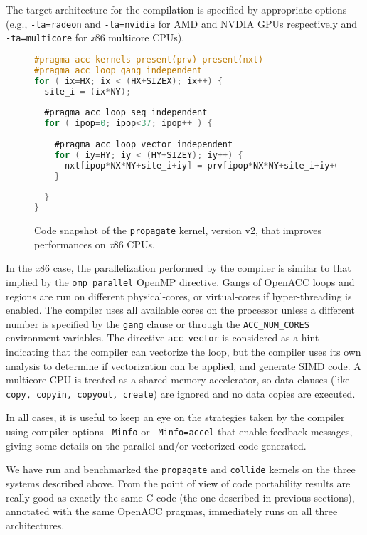 \documentclass[times]{cpeauth}
\begin{document}
The target architecture for the compilation is specified by appropriate
options  (e.g., {\tt -ta=radeon} and {\tt -ta=nvidia} for AMD and NVDIA
GPUs respectively and {\tt -ta=multicore}  for {\em x}86 multicore CPUs).

%
\begin{figure}
\centering
\begin{lstlisting}[language=C,basicstyle=\footnotesize]
#pragma acc kernels present(prv) present(nxt)
#pragma acc loop gang independent
for ( ix=HX; ix < (HX+SIZEX); ix++) {
  site_i = (ix*NY);
  
  #pragma acc loop seq independent
  for ( ipop=0; ipop<37; ipop++ ) {
  
    #pragma acc loop vector independent
    for ( iy=HY; iy < (HY+SIZEY); iy++) {
      nxt[ipop*NX*NY+site_i+iy] = prv[ipop*NX*NY+site_i+iy+OFFSET[ipop]];
    }
     
  }
}
\end{lstlisting}
\caption{\label{fig:propagate2} Code snapshot of the {\tt propagate} kernel, 
version v2, that improves performances on {\em x}86 CPUs.}
\end{figure}
%

In the {\em x}86 case, the parallelization performed by the compiler is similar to that
implied by the {\tt omp parallel} OpenMP directive. 
Gangs of OpenACC loops and regions are run on different physical-cores,
or  virtual-cores if hyper-threading is enabled. The compiler  uses all
available cores  on the processor unless a different number is
specified by the {\tt gang} clause or through the {\tt ACC\_NUM\_CORES}
environment variables. The directive {\tt acc vector} is considered as a hint
indicating that the compiler can vectorize the loop, but the
compiler uses its own analysis to determine if vectorization 
can be applied, and generate SIMD code.  A multicore CPU is treated as
a shared-memory accelerator, so data clauses  (like {\tt copy, copyin,
copyout, create}) are ignored and no data copies are executed. 

In all cases, it is useful to  keep an eye on the strategies taken by 
the compiler using  compiler options {\tt -Minfo} or {\tt -Minfo=accel} 
that enable feedback messages, giving some details on the parallel 
and/or vectorized code generated.

We have run and benchmarked the {\tt propagate} and {\tt collide}
kernels  on the three systems described above. From the point of view of code
portability results are really good as exactly the same C-code (the one
described in previous sections), annotated  with the same OpenACC
pragmas, immediately runs on all three architectures.
\end{document}
